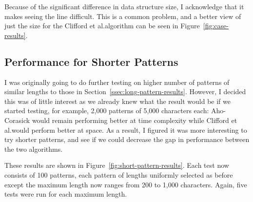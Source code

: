 \documentclass[ %
                    author={Dominic Joseph Moylett},
                    degree={MEng},
                     title={Dictionary Matching with Fingerprints},
                  subtitle={An Empirical Analysis},
                      type={research},
                      year={2015} ]{dissertation}
\begin{document}
Because of the significant difference in data structure size, I acknowledge that it makes seeing the line difficult. This is a common problem, and a better view of just the size for the Clifford et al.\@ algorithm can be seen in Figure~\ref{fig:case-results}.

\subsection{Performance for Shorter Patterns}
\label{ssec:short-pattern-results}

I was originally going to do further testing on higher number of patterns of similar lengths to those in Section~\ref{ssec:long-pattern-results}. However, I decided this was of little interest as we already knew what the result would be if we started testing, for example, 2,000 patterns of 5,000 characters each: Aho-Corasick would remain performing better at time complexity while Clifford et al.\@ would perform better at space. As a result, I figured it was more interesting to try shorter patterns, and see if we could decrease the gap in performance between the two algorithms.

These results are shown in Figure~\ref{fig:short-pattern-results}. Each test now consists of 100 patterns, each pattern of lengths uniformly selected as before except the maximum length now ranges from 200 to 1,000 characters. Again, five tests were run for each maximum length.
\end{document}
